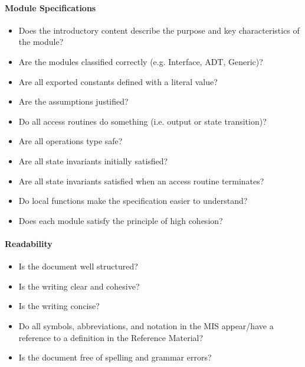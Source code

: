 \paragraph{Module Specifications}
\begin{itemize}

    \item Does the introductory content describe the purpose and key
    characteristics of the module?

    \item Are the modules classified correctly (e.g. Interface, ADT, Generic)?

    \item Are all exported constants defined with a literal value?

    \item Are the assumptions justified?

    \item Do all access routines do something (i.e. output or state transition)?

    \item Are all operations type safe?

    \item Are all state invariants initially satisfied?

    \item Are all state invariants satisfied when an access routine terminates?

    \item Do local functions make the specification easier to understand?

    \item Does each module satisfy the principle of high cohesion?

\end{itemize}

\paragraph{Readability}
\begin{itemize}

    \item Is the document well structured?

    \item Is the writing clear and cohesive?

    \item Is the writing concise?

    \item Do all symbols, abbreviations, and notation in the MIS appear/have a
    reference to a definition in the Reference Material?

    \item Is the document free of spelling and grammar errors?

\end{itemize}